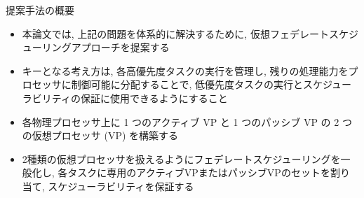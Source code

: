 \begin{frame}{提案手法の概要}
    \begin{itemize}
        \item 本論文では, 上記の問題を体系的に解決するために, 仮想フェデレートスケジューリングアプローチを提案する
        \item キーとなる考え方は, 各高優先度タスクの実行を管理し, 残りの処理能力をプロセッサに制御可能に分配することで, 低優先度タスクの実行とスケジューラビリティの保証に使用できるようにすること
        \item 各物理プロセッサ上に 1 つのアクティブ VP と 1 つのパッシブ VP の 2 つの仮想プロセッサ (VP) を構築する
        \item 2種類の仮想プロセッサを扱えるようにフェデレートスケジューリングを一般化し, 各タスクに専用のアクティブVPまたはパッシブVPのセットを割り当て, スケジューラビリティを保証する
    \end{itemize}
\end{frame}
